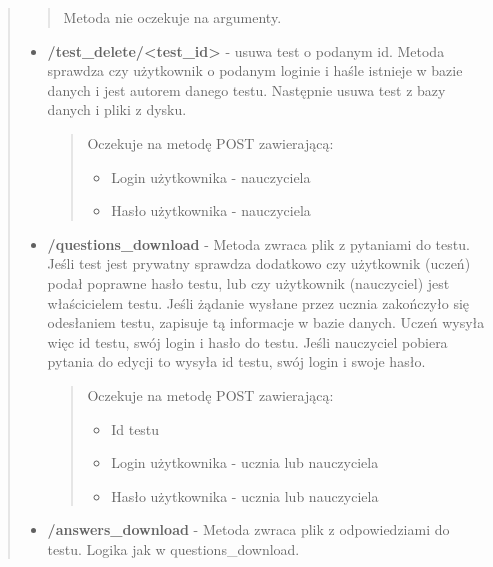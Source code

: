 \documentclass[letterpaper,10pt,polish]{manual}
\begin{document}
\begin{quote}
\begin{itemize}
\begin{quote}
Metoda nie oczekuje na argumenty.
\end{quote}

\end{itemize}
\hypertarget{test-delete}{}\begin{itemize}
\item {} 
\textbf{/test\_delete/\textless{}test\_id\textgreater{}} - usuwa test o podanym id. Metoda sprawdza czy użytkownik o podanym loginie i haśle istnieje w bazie danych i jest autorem danego testu. Następnie usuwa test z bazy danych i pliki z dysku.
\begin{quote}

Oczekuje na metodę POST zawierającą:
\begin{itemize}
\item {} 
Login użytkownika - nauczyciela

\item {} 
Hasło użytkownika - nauczyciela

\end{itemize}
\end{quote}

\end{itemize}
\hypertarget{questions-download}{}\begin{itemize}
\item {} 
\textbf{/questions\_download} - Metoda zwraca plik z pytaniami do testu. Jeśli test jest prywatny sprawdza dodatkowo czy użytkownik (uczeń) podał poprawne hasło testu, lub czy użytkownik (nauczyciel) jest właścicielem testu. Jeśli żądanie wysłane przez ucznia zakończyło się odesłaniem testu, zapisuje tą informacje w bazie danych. Uczeń wysyła więc id testu, swój login i hasło do testu. Jeśli nauczyciel pobiera pytania do edycji to wysyła id testu, swój login i swoje hasło.
\begin{quote}

Oczekuje na metodę POST zawierającą:
\begin{itemize}
\item {} 
Id testu

\item {} 
Login użytkownika - ucznia lub nauczyciela

\item {} 
Hasło użytkownika - ucznia lub nauczyciela

\end{itemize}
\end{quote}

\end{itemize}
\hypertarget{answers-download}{}\begin{itemize}
\item {} 
\textbf{/answers\_download} - Metoda zwraca plik z odpowiedziami do testu. Logika jak w questions\_download.
\begin{quote}


\end{quote}
\end{itemize}
\end{quote}
\end{document}
